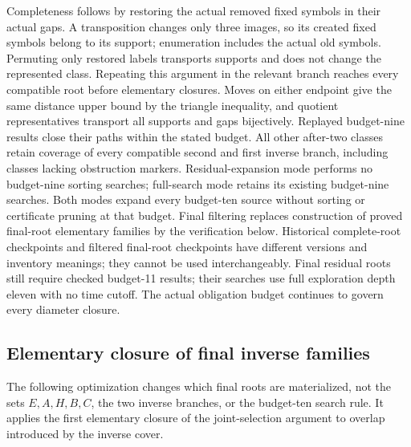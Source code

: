 \documentclass[11pt,a4paper]{article}
\begin{document}
Completeness follows by restoring the actual removed fixed symbols in their
actual gaps. A transposition changes only three images, so its created fixed
symbols belong to its support; enumeration includes the actual old symbols.
Permuting only restored labels transports supports and does not change the
represented class. Repeating this argument in the relevant branch reaches
every compatible root before elementary closures. Moves on either endpoint give the same distance upper
bound by the triangle inequality, and quotient representatives transport all
supports and gaps bijectively. Replayed budget-nine results close their paths
within the stated budget. All other after-two classes retain coverage of every
compatible second and first inverse branch, including classes lacking
obstruction markers. Residual-expansion mode performs no budget-nine sorting
searches; full-search mode retains its existing budget-nine searches. Both
modes expand every budget-ten source without sorting or certificate pruning
at that budget. Final filtering replaces construction of proved final-root
elementary families by the verification below. Historical complete-root
checkpoints and filtered final-root checkpoints have different versions and
inventory meanings; they cannot be used interchangeably. Final residual roots
still require checked budget-11 results; their searches use full exploration
depth eleven with no time cutoff. The actual obligation budget continues to
govern every diameter closure.

\subsection{Elementary closure of final inverse families}
\label{sec:inverse-families}
The following optimization changes which final roots are materialized, not
the sets $E,A,H,B,C$, the two inverse branches, or the budget-ten search rule.
It applies the first elementary closure of the joint-selection argument to
overlap introduced by the inverse cover.
\end{document}
